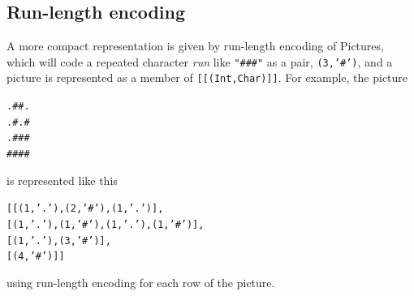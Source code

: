 \subsection*{Run-length encoding}

A more compact representation is given by run-length encoding of Pictures, which will code a repeated character \emph{run} like \texttt{"\#\#\#"} as a pair, \texttt{(3,'\#')}, and a picture is represented as a member of \texttt{[[(Int,Char)]]}. For example, the picture
\begin{alltt}
.##.
.#.#
.###
####
\end{alltt}
is represented like this
\begin{alltt}
[ [(1,'.'), (2,'#'), (1,'.')],
  [(1,'.'), (1,'#'), (1,'.'), (1,'#')],
  [(1,'.'), (3,'#')],
  [(4,'#')] ]
\end{alltt}
using run-length encoding for each row of the picture.


